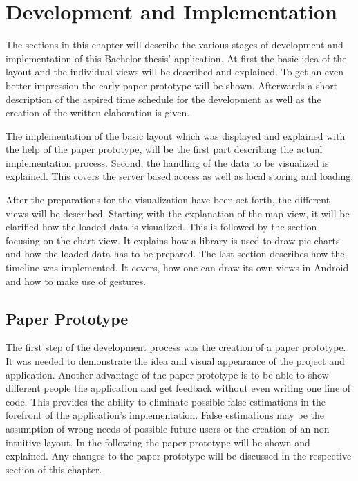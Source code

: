 \chapter{Development and Implementation}
\label{cha:implementation}
The sections in this chapter will describe the various stages of development and implementation of this Bachelor thesis' application. At first the basic idea of the layout and the individual views will be described and explained. To get an even better impression the early paper prototype will be shown. Afterwards a short description of the aspired time schedule for the development as well as the creation of the written elaboration is given.

The implementation of the basic layout which was displayed and explained with the help of the paper prototype, will be the first part describing the actual implementation process.
Second, the handling of the data to be visualized is explained. This covers the server based access as well as local storing and loading. 

After the preparations for the visualization have been set forth, the different views will be described. Starting with the explanation of the map view, it will be clarified how the loaded data is visualized. This is followed by the section focusing on the chart view. It explains how a library is used to draw pie charts and how the loaded data has to be prepared. The last section describes how the timeline was implemented. It covers, how one can draw its own views in Android and how to make use of gestures.
\newpage
\section{Paper Prototype}
\label{sec:paper_prototype}
The first step of the development process was the creation of a paper prototype. It was needed to demonstrate the idea and visual appearance of the project and application. Another advantage of the paper prototype is to be able to show different people the application and get feedback without even writing one line of code. This provides the ability to eliminate possible false estimations  in the forefront of the application's implementation. False estimations may be the assumption of wrong needs of possible future users or the creation of an non intuitive layout. In the following the paper prototype will be shown and explained. Any changes to the paper prototype will be discussed in the respective section of this chapter. 

